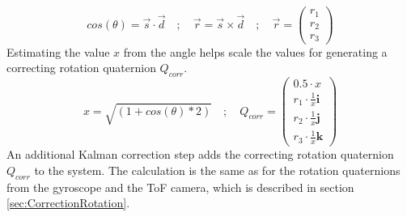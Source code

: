\begin{equation*}
    cos(\theta) = \vec{s}\cdot\vec{d} \quad ; \quad \vec{r} = \vec{s}\times\vec{d} \quad ; \quad
    \vec{r} =
    \begin{pmatrix}
        r_{1} \\
        r_{2} \\
        r_{3}
    \end{pmatrix} 
\end{equation*}
Estimating the value $x$ from the angle helps scale the values for generating a correcting rotation quaternion $Q_{corr}$.
\begin{equation*}
    x=\sqrt{(1+cos(\theta)*2)} \quad ; \quad Q_{corr} =
    \begin{pmatrix}
        0.5\cdot x           \\
        r_{1}\cdot\frac{1}{x}\textbf{i} \\
        r_{2}\cdot\frac{1}{x}\textbf{j} \\
        r_{3}\cdot\frac{1}{x}\textbf{k}
    \end{pmatrix}    
\end{equation*}
An additional Kalman correction step adds the correcting rotation quaternion $Q_{corr}$ to the system. The calculation is the same as for the rotation quaternions from the gyroscope and the ToF camera, which is described in section \ref{sec:CorrectionRotation}.

